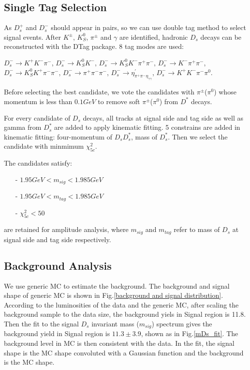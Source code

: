 \subsection{Single Tag Selection}
As $D_{s}^{+}$ and $D_{s}^{-}$ should appear in pairs, so we can use double tag method to select signal events. After $K^{\pm}$, $K_S^{0}$, $\pi^{\pm}$ and $\gamma$ are identified, hadronic $D_{s}$ decays can be reconstructed with the DTag package. 8 tag modes are used:

$D_{s}^{-} \rightarrow K^{+}K^{-}\pi^{-}$, $D_{s}^{-} \rightarrow K_{S}^{0}K^{-}$, $D_{s}^{-} \rightarrow K_{S}^{0}K^{-}\pi^{+}\pi^{-}$, $D_{s}^{-} \rightarrow K^{-}\pi^{+}\pi^{-}$, $D_{s}^{-} \rightarrow K_{S}^{0}K^{+}\pi^{-}\pi^{-}$, $D_{s}^{-} \rightarrow \pi^{+}\pi^{-}\pi^{-}$, $D_{s}^{-} \rightarrow \eta^{'}_{\pi^{+}\pi^{-}\eta_{\gamma\gamma}}$, $D_{s}^{-} \rightarrow K^{+}K^{-}\pi^{-}\pi^{0}$.


Before selecting the best candidate,  we vote the candidates with $\pi^{\pm}$($\pi^{0}$) whose momentum is less than $0.1GeV$ to remove soft $\pi^{\pm}$($\pi^{0}$) from $D^{*}$ decays.


For every candidate of $D_{s}$ decays, all tracks at signal side and tag side as well as gamma from $D_{s}^{*}$ are added to apply kinematic fitting. 5 constrains are added in kinematic fitting: four-momentum of $D_{s}D_{s}^{*}$, mass of $D_{s}^{*}$. Then we select the candidate with minmimum $\chi_{5c}^{2}$.  

The candidates satisfy:
\begin{itemize}
	\item[-] $1.95GeV < m_{sig} < 1.985GeV$
	\item[-] $1.95GeV < m_{tag} < 1.985GeV$
	\item[-] $\chi_{5c}^{2} < 50 $
\end{itemize}
are retained for amplitude analysis, where $m_{sig}$ and $m_{tag}$ refer to mass of $D_{s}$ at signal side and tag side respectively.

\subsection{Background Analysis}
We use generic MC to estimate the background. The background and signal shape of generic MC is shown in Fig.\ref{background and signal distribution}. According to the luminosities of the data and the generic MC, after scaling the background sample to the data size, the background yiels in Signal region is 11.8. Then the fit to the signal $D_{s}$ invariant mass ($m_{sig}$) spectrum gives the background yield in Signal region is $11.3 \pm 3.9$, shown as in Fig.\ref{mDs_fit}.  The background level in MC is then consistent with the data. In the fit, the signal shape is the MC shape convoluted with a Gaussian function and the background is the MC shape. 

